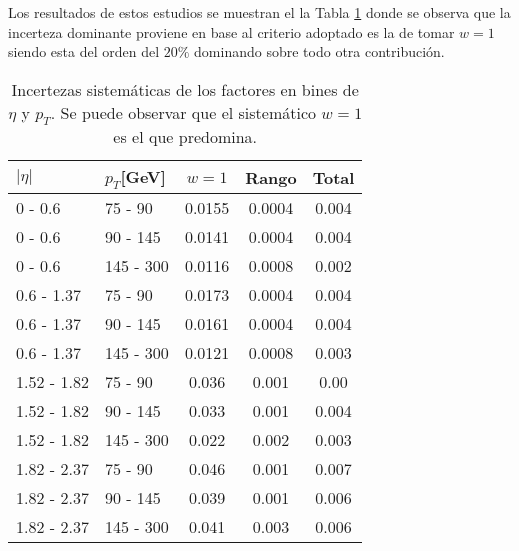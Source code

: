 Los resultados de estos estudios se muestran el la Tabla \ref{ta:syst} donde se observa que la incerteza dominante proviene en base al criterio adoptado es la de tomar $w=1$ siendo esta del orden del $20 \%$ dominando sobre todo otra contribución.


\begin{table}
\centering
\begin{threeparttable}
\caption{Incertezas sistemáticas de los factores en bines de $\eta$ y $p_{T}$. Se puede observar que el sistemático $w=1$ es el que predomina.}
\begin{tabular}{ l l c c c }

	\hline
	\hline

	$|\eta|$ & $p_{T}$[GeV] & $w=1$ & Rango & Total \\
	\hline

	0 - 0.6 	& 75 - 90 	& 0.0155 & 0.0004 & 0.004 \\

	0 - 0.6 	& 90 - 145 	& 0.0141 & 0.0004 & 0.004 \\

	0 - 0.6 	& 145 - 300 & 0.0116 & 0.0008 & 0.002 \\

	\hline

	0.6 - 1.37 	& 75 - 90 	& 0.0173 & 0.0004 & 0.004 \\

	0.6 - 1.37 	& 90 - 145 	& 0.0161 & 0.0004 & 0.004 \\

	0.6 - 1.37 	& 145 - 300 & 0.0121 & 0.0008 & 0.003 \\

	\hline

	1.52 - 1.82 & 75 - 90 	& 0.036  & 0.001 & 0.00 \\

	1.52 - 1.82 & 90 - 145 	& 0.033  & 0.001 & 0.004 \\

	1.52 - 1.82 & 145 - 300 & 0.022  & 0.002 & 0.003 \\

	\hline

	1.82 - 2.37 & 75 - 90 	& 0.046		& 0.001 & 0.007 \\

	1.82 - 2.37 & 90 - 145	& 0.039		& 0.001 & 0.006 \\

	1.82 - 2.37 & 145 - 300 & 0.041		& 0.003 & 0.006 \\

	\hline
\end{tabular}
\label{ta:syst}
\end{threeparttable}
\end{table}

